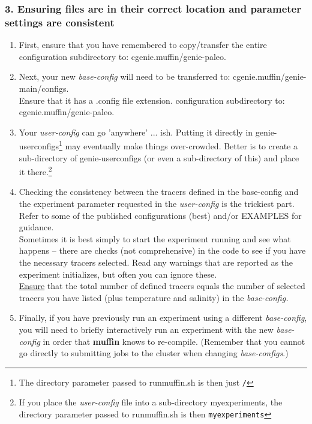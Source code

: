 \documentclass[11pt,fleqn]{book} %
\begin{document}
%
\subsubsection{3. Ensuring files are in their correct location and parameter settings are consistent}

\begin{enumerate}[noitemsep]
\vspace{1mm}
\item First, ensure that you have remembered to copy/transfer the entire configuration subdirectory to: \textsf{\footnotesize cgenie.muffin/genie-paleo}.
\vspace{1mm}
\item Next, your new \textit{base-config} will need to be transferred to: \textsf{\footnotesize cgenie.muffin/genie-main/configs}.
\\Ensure that it has a \textsf{\footnotesize .config} file extension. configuration subdirectory to: \textsf{\footnotesize cgenie.muffin/genie-paleo}.
\vspace{1mm}
\item Your \textit{user-config} can go 'anywhere' ... ish. Putting it directly in \textsf{\footnotesize genie-userconfigs}\footnote{The directory parameter passed to \textsf{\footnotesize runmuffin.sh} is then just \texttt{/}} may eventually make things over-crowded. Better is to create a sub-directory of \textsf{\footnotesize genie-userconfigs} (or even a sub-directory of this) and place it there.\footnote{If you place the \textit{user-config} file into a sub-directory  \textsf{\footnotesize myexperiments}, the directory parameter passed to \textsf{\footnotesize runmuffin.sh} is then \texttt{myexperiments}}
\vspace{1mm}
\item Checking the consistency between the tracers defined in the base-config and the experiment parameter requested in the \textit{user-config} is the trickiest part. Refer to some of the published configurations (best) and/or EXAMPLES for guidance.
\\ Sometimes it is best simply to start the experiment running and see what happens -- there are checks (not comprehensive) in the code to see if you have the necessary tracers selected. Read any warnings that are reported as the experiment initializes, but often you can ignore these.
\\\uline{Ensure} that the total number of defined tracers equals the number of selected tracers you have listed (plus temperature and salinity) in the \textit{base-config.}
\vspace{1mm}
\item Finally, if you have previously run an experiment using a different \textit{base-config}, you will need to briefly interactively run an experiment with the new \textit{base-config} in order that \textbf{muffin} knows to re-compile. (Remember that you cannot go directly to submitting jobs to the cluster when changing \textit{base-configs}.)
\end{enumerate}
\end{document}
